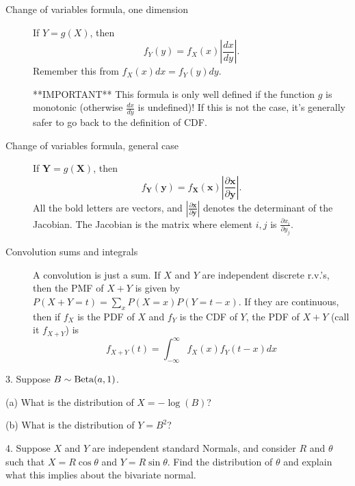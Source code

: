 \documentclass{article}
\begin{document}
\begin{description}
    \item[Change of variables formula, one dimension] If $Y = g(X)$, then $$f_Y(y) = f_X(x)\left|\frac{dx}{dy}\right|.$$
    Remember this from $f_X(x)dx = f_Y(y)dy$.

    **IMPORTANT** This formula is only well defined if the function $g$ is monotonic (otherwise $\frac{dx}{dy}$ is undefined)! If this is not the case, it's generally safer to go back to the definition of CDF.
    
    \item[Change of variables formula, general case] If $\mathbf{Y} = g(\mathbf{X})$, then $$f_\mathbf{Y}(\mathbf{y}) = f_\mathbf{X}(\mathbf{x})\left|\frac{\partial \mathbf{x}}{\partial \mathbf{y}}\right|.$$
    All the bold letters are vectors, and $\left|\frac{\partial \mathbf{x}}{\partial \mathbf{y}}\right|$ denotes the determinant of the Jacobian. The Jacobian is the matrix where element $i, j$ is $\frac{\partial x_i}{\partial y_j}$.
    
    \item[Convolution sums and integrals] A convolution is just a sum. If $X$ and $Y$ are independent discrete r.v.'s, then the PMF of $X+Y$ is given by $P(X+Y=t) = \sum_x P(X=x)P(Y=t-x)$. If they are continuous, then if $f_X$ is the PDF of $X$ and $f_Y$ is the CDF of $Y$, the PDF of $X+Y$ (call it $f_{X+Y}$) is 
    $$f_{X+Y}(t) = \int_{-\infty}^{\infty} f_X(x)f_Y(t-x) dx
    $$
\end{description}

3. Suppose $B \sim \textrm{Beta}(a, 1)$. 

(a) What is the distribution of $X = -\log(B)$? 


(b) What is the distribution of $Y = B^2$?


4. Suppose $X$ and $Y$ are independent standard Normals, and consider $R$ and $\theta$ such that $X = R\cos\theta$ and $Y = R\sin\theta$. Find the distribution of $\theta$ and explain what this implies about the bivariate normal.
\end{document}
